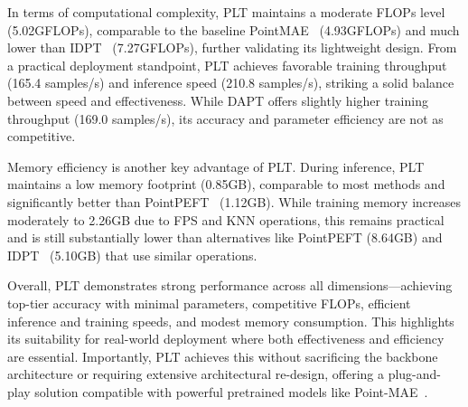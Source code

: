 In terms of computational complexity, PLT maintains a moderate FLOPs level (5.02GFLOPs), comparable to the baseline PointMAE~\cite{pang2022masked} (4.93GFLOPs) and much lower than IDPT~\cite{zha2023instance} (7.27GFLOPs), further validating its lightweight design. From a practical deployment standpoint, PLT achieves favorable training throughput (165.4 samples/s) and inference speed (210.8 samples/s), striking a solid balance between speed and effectiveness. While DAPT offers slightly higher training throughput (169.0 samples/s), its accuracy and parameter efficiency are not as competitive.


Memory efficiency is another key advantage of PLT. During inference, PLT maintains a low memory footprint (0.85GB), comparable to most methods and significantly better than PointPEFT~\cite{tang2024point} (1.12GB). While training memory increases moderately to 2.26GB due to FPS and KNN operations, this remains practical and is still substantially lower than alternatives like PointPEFT (8.64GB) and IDPT~\cite{zha2023instance} (5.10GB) that use similar operations.

Overall, PLT demonstrates strong performance across all dimensions—achieving top-tier accuracy with minimal parameters, competitive FLOPs, efficient inference and training speeds, and modest memory consumption. This highlights its suitability for real-world deployment where both effectiveness and efficiency are essential. Importantly, PLT achieves this without sacrificing the backbone architecture or requiring extensive architectural re-design, offering a plug-and-play solution compatible with powerful pretrained models like Point-MAE~\cite{pang2022masked}.